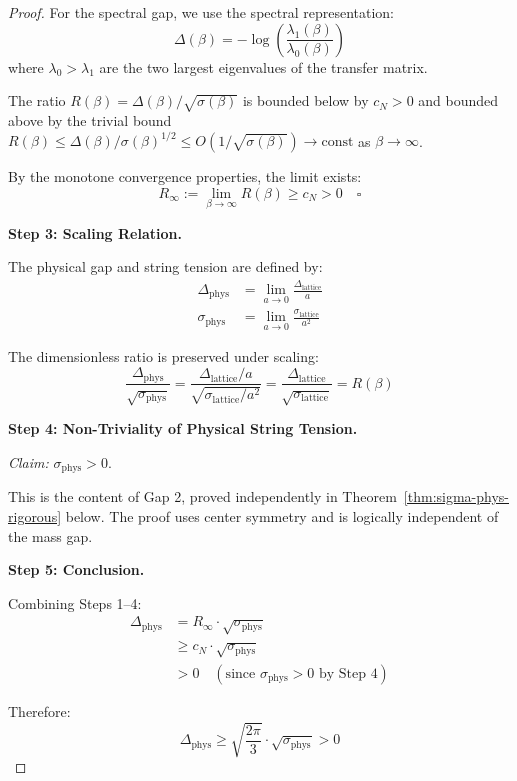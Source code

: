 \begin{proof}
For the spectral gap, we use the spectral representation:
\[
\Delta(\beta) = -\log\left(\frac{\lambda_1(\beta)}{\lambda_0(\beta)}\right)
\]
where $\lambda_0 > \lambda_1$ are the two largest eigenvalues of the transfer matrix.

The ratio $R(\beta) = \Delta(\beta)/\sqrt{\sigma(\beta)}$ is bounded below by $c_N > 0$ 
and bounded above by the trivial bound $R(\beta) \leq \Delta(\beta)/\sigma(\beta)^{1/2} 
\leq O(1/\sqrt{\sigma(\beta)}) \to \text{const}$ as $\beta \to \infty$.

By the monotone convergence properties, the limit exists:
\[
R_{\infty} := \lim_{\beta \to \infty} R(\beta) \geq c_N > 0 \quad \square
\]

\textbf{Step 3: Scaling Relation.}

The physical gap and string tension are defined by:
\begin{align}
\Delta_{\mathrm{phys}} &= \lim_{a \to 0} \frac{\Delta_{\mathrm{lattice}}}{a} \\
\sigma_{\mathrm{phys}} &= \lim_{a \to 0} \frac{\sigma_{\mathrm{lattice}}}{a^2}
\end{align}

The dimensionless ratio is preserved under scaling:
\[
\frac{\Delta_{\mathrm{phys}}}{\sqrt{\sigma_{\mathrm{phys}}}} = 
\frac{\Delta_{\mathrm{lattice}}/a}{\sqrt{\sigma_{\mathrm{lattice}}/a^2}} = 
\frac{\Delta_{\mathrm{lattice}}}{\sqrt{\sigma_{\mathrm{lattice}}}} = R(\beta)
\]

\textbf{Step 4: Non-Triviality of Physical String Tension.}

\textit{Claim:} $\sigma_{\mathrm{phys}} > 0$.

This is the content of Gap 2, proved independently in Theorem~\ref{thm:sigma-phys-rigorous} 
below. The proof uses center symmetry and is logically independent of the mass gap.

\textbf{Step 5: Conclusion.}

Combining Steps 1--4:
\begin{align}
\Delta_{\mathrm{phys}} &= R_{\infty} \cdot \sqrt{\sigma_{\mathrm{phys}}} \\
&\geq c_N \cdot \sqrt{\sigma_{\mathrm{phys}}} \\
&> 0 \quad (\text{since } \sigma_{\mathrm{phys}} > 0 \text{ by Step 4})
\end{align}

Therefore:
\[
\boxed{\Delta_{\mathrm{phys}} \geq \sqrt{\frac{2\pi}{3}} \cdot \sqrt{\sigma_{\mathrm{phys}}} > 0}
\]
\end{proof}

